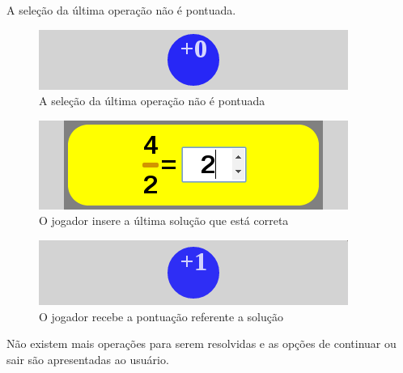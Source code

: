A seleção da última operação não é pontuada.

\begin{figure}[H]
	\caption{\label{score_0_1}A seleção da última operação não é pontuada}
	\begin{center}
	    \includegraphics[scale=1]{score_0.png}
	\end{center}
\end{figure}

\begin{figure}[H]
	\caption{\label{xp_10}O jogador insere a última solução que está correta}
	\begin{center}
	    \includegraphics[scale=1]{xp_4_10_rightans_3.png}
	\end{center}
\end{figure}

\begin{figure}[H]
	\caption{\label{score_1_3}O jogador recebe a pontuação referente a solução}
	\begin{center}
	    \includegraphics[scale=1]{score_1.png}
	\end{center}
\end{figure}

	Não existem mais operações para serem resolvidas e as opções de continuar ou sair são apresentadas ao usuário.
	
